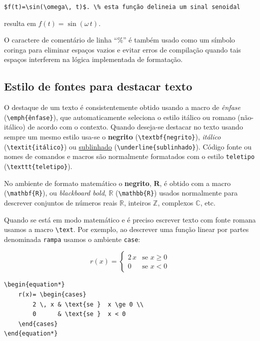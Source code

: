 \verb|$f(t)=\sin(\omega\, t)$. \% esta função delineia um sinal senoidal| 

resulta em $f(t)=\sin(\omega\, t)$. %

O caractere de comentário de linha ``\%'' é também usado como um símbolo coringa  para eliminar espaços vazios e evitar erros de compilação quando tais espaços interferem na lógica implementada de formatação.

\subsection{Estilo de fontes para  destacar texto}

O destaque de um texto é consistentemente obtido usando  a macro de  \emph{ênfase} (\verb|\emph{ênfase}|), que automaticamente seleciona o estilo itálico ou romano (não-itálico) de acordo com o contexto. Quando deseja-se destacar  no texto usando sempre um mesmo estilo usa-se  o   \textbf{negrito} (\verb|\textbf{negrito}|),  \textit{itálico} (\verb|\textit{itálico}|) ou \underline{sublinhado} (\verb|\underline{sublinhado}|). Código fonte ou nomes de comandos e macros são normalmente formatados com o estilo \texttt{teletipo} (\verb|\texttt{teletipo}|).

No ambiente de formato matemático o \textbf{negrito}, $\mathbf{R}$, é obtido com a macro (\verb|\mathbf{R}|), ou \emph{blackboard bold}, $\mathbb{R}$ (\verb|\mathbb{R}|) usados normalmente para descrever conjuntos de números reais $\mathbb{R}$, inteiros $\mathbb{Z}$, complexos $\mathbb{C}$, etc. 

Quando se está em modo matemático e é preciso escrever texto com fonte romana usamos a macro \verb|\text|.  Por exemplo, ao descrever uma função linear por partes denominada \texttt{rampa} usamos o ambiente \verb|case|:

\begin{multicols}{2}
	\begin{equation*}
		r(x)= \begin{cases}
			2\,x & \text{se }  x \ge 0 \\
			0 & \text{se }  x < 0
		\end{cases}
	\end{equation*}
	\vfill\null 
	\columnbreak
\begin{lstlisting}[language={[Latex]Tex},frame=single]
\begin{equation*}
	r(x)= \begin{cases}
		2 \, x & \text{se }  x \ge 0 \\
		0      & \text{se }  x < 0
	\end{cases}
\end{equation*}
\end{lstlisting}
\end{multicols}

